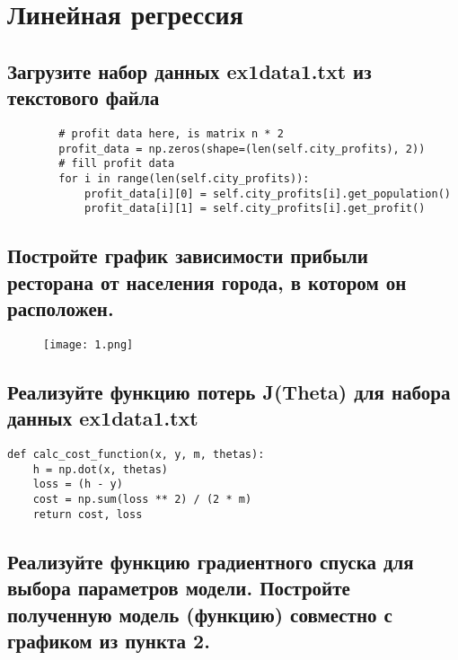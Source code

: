 







\section{Линейная регрессия}
\label{sec:purpose}

\subsection{Загрузите набор данных ex1data1.txt из текстового файла}

\begin{lstlisting}
		# profit data here, is matrix n * 2
        profit_data = np.zeros(shape=(len(self.city_profits), 2))
        # fill profit data
        for i in range(len(self.city_profits)):
            profit_data[i][0] = self.city_profits[i].get_population()
            profit_data[i][1] = self.city_profits[i].get_profit()
\end{lstlisting}

\subsection{Постройте график зависимости прибыли ресторана от населения города, в котором он расположен.}

\begin{figure}[h]
\centering
	\texttt{[image: 1.png]}
	\label{sec:purpose:payings}
\end{figure}

\subsection{Реализуйте функцию потерь J(Theta) для набора данных ex1data1.txt}

\begin{lstlisting}
def calc_cost_function(x, y, m, thetas):
    h = np.dot(x, thetas)
    loss = (h - y)
    cost = np.sum(loss ** 2) / (2 * m)
    return cost, loss
\end{lstlisting}

\subsection{Реализуйте функцию градиентного спуска для выбора параметров модели. Постройте полученную модель (функцию) совместно с графиком из пункта 2.}

